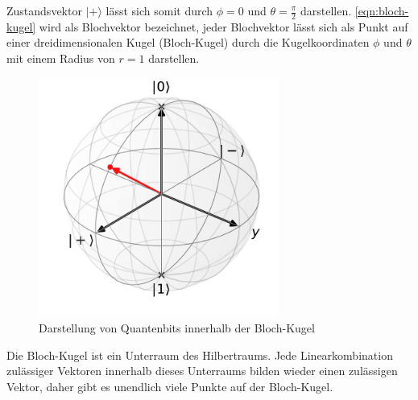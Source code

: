 Zustandsvektor $|+\rangle$ l\"asst sich somit durch $\phi= 0$ und $\theta = \frac{\pi}{2}$ darstellen. \ref{eqn:bloch-kugel} wird als Blochvektor bezeichnet, jeder Blochvektor l\"asst sich als Punkt auf einer dreidimensionalen Kugel (Bloch-Kugel) durch die Kugelkoordinaten $\phi$ und $\theta$ mit einem Radius von $r = 1$ darstellen.
\begin{figure}[h]
\centering
\includegraphics[width=0.7\textwidth]{figures/blochsphere.pdf}
\caption{Darstellung von Quantenbits innerhalb der Bloch-Kugel}
\label{fig:Bloch-Kugel}
\end{figure}
Die Bloch-Kugel ist ein Unterraum des Hilbertraums. Jede Linearkombination zul\"assiger Vektoren innerhalb dieses Unterraums bilden wieder einen zul\"assigen Vektor, daher gibt es unendlich viele Punkte auf der Bloch-Kugel.
